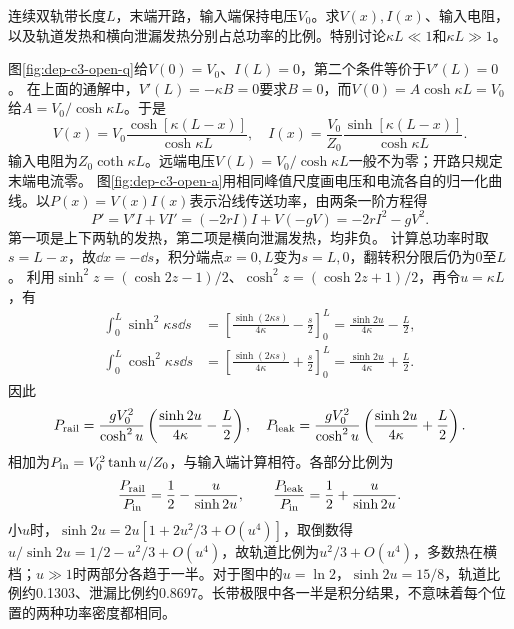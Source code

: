 \begin{example}[开路电阻带的能量沿途分配]
连续双轨带长度$L$，末端开路，输入端保持电压$V_0$。求$V(x),I(x)$、输入电阻，以及轨道发热和横向泄漏发热分别占总功率的比例。特别讨论$\kappa L\ll1$和$\kappa L\gg1$。
\end{example}
\begin{solution}
图\ref{fig:dep-c3-open-q}给$V(0)=V_0$、$I(L)=0$，第二个条件等价于$V'(L)=0$。
在上面的通解中，$V'(L)=-\kappa B=0$要求$B=0$，而$V(0)=A\cosh\kappa L=V_0$给$A=V_0/\cosh\kappa L$。于是
\[
 V(x)=V_0\frac{\cosh[\kappa(L-x)]}{\cosh\kappa L},\quad
 I(x)=\frac{V_0}{Z_0}\frac{\sinh[\kappa(L-x)]}{\cosh\kappa L}.
\]
输入电阻为$Z_0\coth\kappa L$。远端电压$V(L)=V_0/\cosh\kappa L$一般不为零；开路只规定末端电流零。
图\ref{fig:dep-c3-open-a}用相同峰值尺度画电压和电流各自的归一化曲线。以$P(x)=V(x)I(x)$表示沿线传送功率，由两条一阶方程得
\[
 P'=V'I+VI'=(-2rI)I+V(-gV)=-2rI^2-gV^2.
\]
第一项是上下两轨的发热，第二项是横向泄漏发热，均非负。
计算总功率时取$s=L-x$，故$\dd x=-\dd s$，积分端点$x=0,L$变为$s=L,0$，翻转积分限后仍为$0$至$L$。
利用$\sinh^2z=(\cosh2z-1)/2$、$\cosh^2z=(\cosh2z+1)/2$，再令$u=\kappa L$，有
\[
 \begin{aligned}
 \int_0^L\sinh^2\kappa s\dd s
 &=\left[\frac{\sinh(2\kappa s)}{4\kappa}-\frac s2\right]_0^L
 =\frac{\sinh2u}{4\kappa}-\frac L2,\\
 \int_0^L\cosh^2\kappa s\dd s
 &=\left[\frac{\sinh(2\kappa s)}{4\kappa}+\frac s2\right]_0^L
 =\frac{\sinh2u}{4\kappa}+\frac L2.
 \end{aligned}
\]
因此
\[
 P_{\rm rail}=\frac{gV_0^2}{\cosh^2u}
 \left(\frac{\sinh2u}{4\kappa}-\frac L2\right),\quad
 P_{\rm leak}=\frac{gV_0^2}{\cosh^2u}
 \left(\frac{\sinh2u}{4\kappa}+\frac L2\right).
\]
相加为$P_{\rm in}=V_0^2\tanh u/Z_0$，与输入端计算相符。各部分比例为
\[
 \frac{P_{\rm rail}}{P_{\rm in}}=\frac12-\frac u{\sinh2u},\qquad
 \frac{P_{\rm leak}}{P_{\rm in}}=\frac12+\frac u{\sinh2u}.
\]
小$u$时，$\sinh2u=2u[1+2u^2/3+O(u^4)]$，取倒数得$u/\sinh2u=1/2-u^2/3+O(u^4)$，故轨道比例为$u^2/3+O(u^4)$，多数热在横档；$u\gg1$时两部分各趋于一半。对于图中的$u=\ln2$，$\sinh2u=15/8$，轨道比例约0.1303、泄漏比例约0.8697。长带极限中各一半是积分结果，不意味着每个位置的两种功率密度都相同。
\end{solution}

